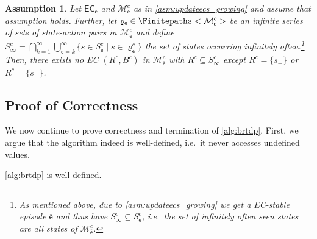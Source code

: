 \documentclass{article}
\newcommand{\UnionSym}{\bigcup}
\newcommand{\IntersectionSym}{\bigcap}
\newcommand{\Union}{\UnionSym}
\newcommand{\Intersection}{\IntersectionSym}
\newcommand{\MDP}{\mathcal{M}}
\newcommand{\States}{S}
\newcommand{\finitepath}{\varrho}
\newcommand{\targetstate}{s_+}
\newcommand{\sinkstate}{s_-}
\newcommand{\algoepisode}{\mathsf{e}}
\newcommand{\algoecs}{\mathsf{EC}}
\newtheorem{assumption}{Assumption}
\begin{document}
\begin{assumption} \label{asm:updateecs_all_visited}
	Let $\algoecs_\algoepisode$ and $\MDP^c_\algoepisode$ as in \cref{asm:updateecs_growing} and assume that assumption holds.
	Further, let $\finitepath_\algoepisode \in \Finitepaths<\MDP^c_\algoepisode>$ be an infinite series of sets of state-action pairs in $\MDP^c_\algoepisode$ and define $\States^c_\infty = \Intersection_{k=1}^\infty \Union_{\algoepisode=k}^\infty \{s \in \States^c_\algoepisode \mid s \in \finitepath^c_\algoepisode\}$ the set of states occurring infinitely often.\footnote{As mentioned above, due to \cref{asm:updateecs_growing} we get a EC-stable episode $\overline{\algoepisode}$ and thus have $\States^c_\infty \subseteq \States_{\overline{\algoepisode}}^c$, i.e.\ the set of infinitely often seen states are all states of $\MDP_{\overline{\algoepisode}}^c$.}
	Then, there exists no EC $(R^c, B^c)$ in $\MDP^c_{\overline{\algoepisode}}$ with $R^c \subseteq \States_\infty^c$ except $R^c = \{\targetstate\}$ or $R^c = \{\sinkstate\}$.
\end{assumption}

\subsection{Proof of Correctness}

We now continue to prove correctness and termination of \cref{alg:brtdp}.
First, we argue that the algorithm indeed is well-defined, i.e.\ it never accesses undefined values.

\begin{lemma}
	\cref{alg:brtdp} is well-defined.
\end{lemma}
\end{document}
